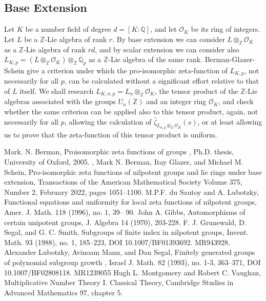 \documentclass[12pt]{article}
\begin{document}
\subsection{Base Extension}
Let $K$ be a number field of degree $d=[K:\mathbb{Q}]$, and let $\mathcal{O}_K$ be its ring of integers. Let $L$ be a $\mathbb{Z}$-Lie algebra of rank $r$. By base extension we can consider $L\otimes_{\mathbb{Z}}\mathcal{O}_K$ as a $\mathbb{Z}$-Lie algebra of rank $rd$, and by scalar extension we can consider also $L_{K,p}=(L\otimes_{\mathbb{Z}}\mathcal{O}_K)\otimes_{\mathbb{Z}}\mathbb{Q}_p$ as a $\mathbb{Z}$-Lie algebra of the same rank. Berman-Glazer-Schein\cite{BermanGlazerSchein} give a criterion under which the pro-isomorphic zeta-function of $L_{K,p}$, not necessarily for all $p$, can be calculated without a significant effort relative to that of $L$ itself. We shall research $L_{K,n,p}=L_n\otimes_{\mathbb{Z}}\mathcal{O}_K$, the tensor product of the $\mathbb{Z}$-Lie algebras associated with the groups $U_n(\mathbb{Z})$ and an integer ring $\mathcal{O}_K$, and check whether the same criterion can be applied also to this tensor product, again, not necessarily for all $p$, allowing the calculation of $\hat\zeta_{L_{n,p}\otimes_{\mathbb{Z}}\mathcal{O}_K}(s)$, or at least allowing us to prove that the zeta-function of this tensor product is uniform.
\begin{thebibliography}{2}
 Mark. N. Berman,
Proisomorphic zeta functions of groups
, Ph.D. thesis, University of Oxford,
2005.
, Mark N. Berman, Itay Glazer, and Michael M. Schein, Pro-isomorphic zeta functions of nilpotent groups and lie rings under base extension, Transactions of the American Mathematical Society Volume 375, Number 2, February 2022, pages 1051–1100.
 M.P.F. du Sautoy and A. Lubotzky, Functional equations and uniformity for
local zeta functions of nilpotent groups, Amer. J. Math. 118 (1996), no. 1, 39–
90.
 John A. Gibbs, Automorphisms of certain unipotent groups, J. Algebra 14 (1970), 203-228.
 F. J. Grunewald, D. Segal, and G. C. Smith, Subgroups of finite index in nilpotent groups,
Invent. Math. 93 (1988), no. 1, 185–223, DOI 10.1007/BF01393692. MR943928.
 Alexander Lubotzky, Avinoam Mann, and Dan Segal,
Finitely generated groups of polynomial
subgroup growth
, Israel J. Math.
82
(1993), no. 1-3, 363–371, DOI 10.1007/BF02808118.
MR1239055
 Hugh L. Montgomery and Robert C. Vaughan, Multiplicative Number Theory I. Classical Theory, Cambridge Studies in Advanced Mathematics 97, chapter 5.
\end{thebibliography}
\end{document}
